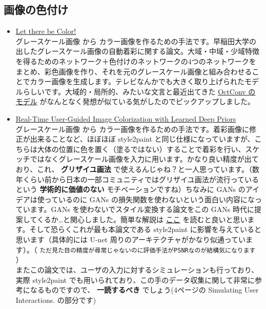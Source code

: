 \documentclass[a4paper, dvipdfmx, 10pt]{article}
\begin{document}
\subsection{画像の色付け}
\label{sec:org95a6be9}
\begin{itemize}
\item \href{http://iizuka.cs.tsukuba.ac.jp/projects/colorization/ja/}{Let there be Color!}\\

グレースケール画像 から カラー画像を作るための手法です。早稲田大学の出したグレースケール画像の自動着彩に関する論文。大域・中域・少域特徴を得るためのネットワーク＋色付けのネットワークの4つのネットワークをまとめ、彩色画像を作り、それを元のグレースケール画像と組み合わせることでカラー画像を生成します。テレビなんかでも大きく取り上げられたモデルらしいです。大域的・局所的、みたいな文言と最近出てきた \href{https://qiita.com/koshian2/items/0e40a5930f1aa63a66b9}{OctConv のモデル} がなんとなく発想が似ている気がしたのでピックアップしました。\\

\item \href{https://richzhang.github.io/ideepcolor/}{Real-Time User-Guided Image Colorization with Learned Deep Priors}\\

グレースケール画像 から カラー画像を作るための手法です。着彩画像に修正が出来ることなど、ほぼほぼ style2paint と同じ仕様になっていますが、こちらは大体の位置に色を置く（塗るではない）することで着彩を行い、スケッチではなくグレースケール画像を入力に用います。かなり良い精度が出ており、これ、 \textbf{グリザイユ画法} で使えるんじゃね？と一人思っています。（数年くらい前から日本の一部コミュニティではグリザイユ画法が流行っているという \textbf{学術的に価値のない} モチベーションですね）ちなみに GANs のアイデアは使っているのに GANs の損失関数を使わないという面白い内容になっています。GANs を使わないでスタイル変換する論文をこの GANs 時代に提案してくるか…と関心しました。簡単な解説は \href{https://github.com/DwangoMediaVillage/paper\_readings/issues/8}{ここ} を読むと良いと思います。そして恐らくこれが最も本論文である style2paint に影響を与えていると思います（具体的には U-net 周りのアーキテクチャがかなり似通っています）。（ \texttt{ただ見た目の精度が尋常じゃないのに評価手法がPSNRなのが結構気になります} ）\\

またこの論文では、ユーザの入力に対するシミュレーションも行っており、実際 style2paint でも用いられており、この手のデータ収集に関して非常に参考になるものですので、 \textbf{一読するべき} でしょう(4ページの Simulating User Interactions. の部分です)\\


\end{itemize}
\end{document}
